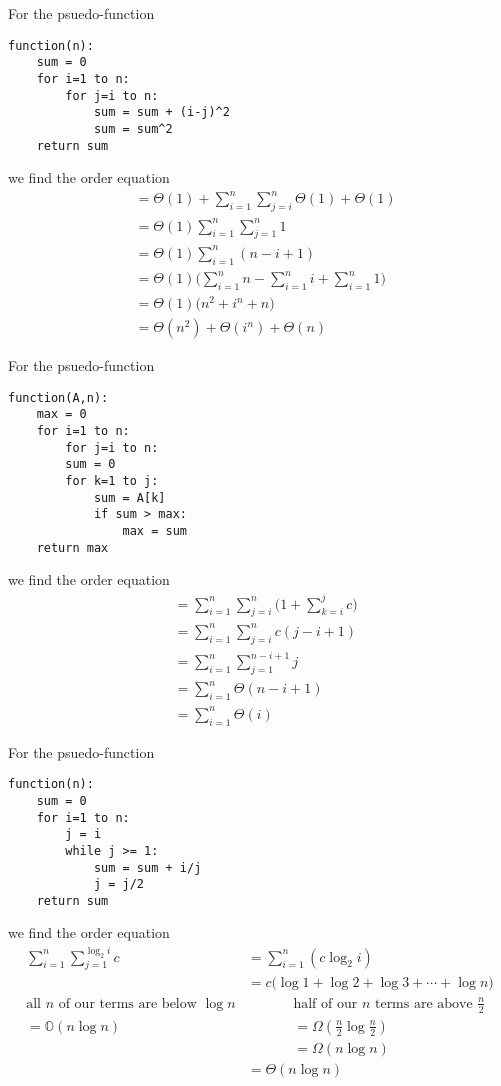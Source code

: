 \documentclass[12pt]{article}
\begin{document}
\begin{example}
For the psuedo-function
\begin{verbatim}
function(n):
    sum = 0
    for i=1 to n:
        for j=i to n:
            sum = sum + (i-j)^2
            sum = sum^2
    return sum
\end{verbatim}
we find the order equation
\begin{align*}
&= \Theta(1) + \sum_{i=1}^n \sum_{j=i}^n \Theta(1) + \Theta(1)\\
&= \Theta(1) \sum_{i=1}^n \sum_{j=1}^n 1\\
&= \Theta(1) \sum_{i=1}^n (n-i+1)\\
&= \Theta(1) \bigg( \sum_{i=1}^n n - \sum_{i=1}^n i + \sum_{i=1}^n 1 \bigg)\\
&= \Theta(1) \bigl( n^2 + i^n + n \bigl)\\
&= \Theta(n^2) + \Theta(i^n) + \Theta(n)
\end{align*}
\end{example}

\begin{example}
For the psuedo-function
\begin{verbatim}
function(A,n):
    max = 0
    for i=1 to n:
        for j=i to n:
        sum = 0
        for k=1 to j:
        	sum = A[k]
        	if sum > max:
        		max = sum
    return max
\end{verbatim}
we find the order equation
\begin{align*}
&= \sum_{i=1}^n \sum_{j=i}^n \bigl( 1 + \sum_{k=i}^j c \bigl)\\
&= \sum_{i=1}^n \sum_{j=i}^n c(j-i+1)\\
&= \sum_{i=1}^n \sum_{j=1}^{n-i+1} j\\
&= \sum_{i=1}^n \Theta(n-i+1)\\
&= \sum_{i=1}^n \Theta(i)
\end{align*}
\end{example}

\begin{example}
For the psuedo-function
\begin{verbatim}
function(n):
    sum = 0
    for i=1 to n:
    	j = i
        while j >= 1:
        	sum = sum + i/j
        	j = j/2
    return sum
\end{verbatim}
we find the order equation
\begin{align*}
\sum_{i=1}^n \sum_{j=1}^{\log_2 i} c &= \sum_{i=1}^n (c \log_2 i)\\
&= c\bigl(\log 1 + \log 2 + \log 3 + \cdots + \log n\bigl)\\
\text{all }n\text{ of our terms are below }\log n &\hspace{40pt} \text{half of our }n\text{ terms are above }\frac{n}{2}\\
= \mathbb{O}(n\log n) &\hspace{40pt}= \Omega(\frac{n}{2}\log\frac{n}{2})\\
&\hspace{40pt}= \Omega(n\log n)\\
&= \Theta(n\log n)
\end{align*}
\end{example}
\end{document}
